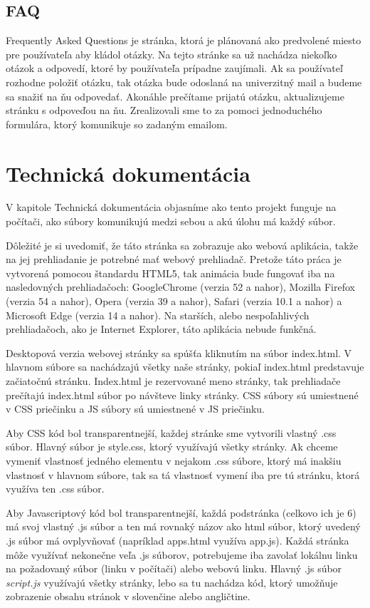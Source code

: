 \subsection{FAQ}
\noindent Frequently Asked Questions je stránka, ktorá je plánovaná ako predvolené miesto pre používateľa aby kládol otázky. Na tejto stránke sa už nachádza niekoľko otázok  a odpovedí, ktoré by používateľa prípadne zaujímali. Ak sa používateľ rozhodne položiť otázku, tak otázka bude odoslaná na univerzitný mail a budeme sa snažiť na ňu odpovedať. Akonáhle prečítame prijatú otázku,  aktualizujeme stránku s odpoveďou na ňu. Zrealizovali sme to za pomoci jednoduchého formulára, ktorý komunikuje so zadaným emailom.

\section{Technická dokumentácia}
\noindent V kapitole Technická dokumentácia objasníme ako tento projekt funguje na počítači, ako súbory komunikujú medzi sebou a akú úlohu má každý súbor. \newline

Dôležité je si uvedomiť, že táto stránka sa zobrazuje ako webová aplikácia, takže na jej prehliadanie je potrebné mať webový prehliadač. Pretože táto práca je vytvorená pomocou štandardu HTML5, tak animácia bude fungovať iba na nasledovných prehliadačoch: GoogleChrome (verzia 52 a nahor), Mozilla Firefox (verzia 54 a nahor), Opera (verzia 39 a nahor), Safari (verzia 10.1 a nahor) a Microsoft Edge (verzia 14 a nahor). Na starších, alebo nespoľahlivých prehliadačoch, ako je Internet Explorer, táto aplikácia nebude funkčná.

Desktopová verzia webovej stránky sa spúšťa kliknutím na súbor index.html. V hlavnom súbore sa nachádzajú všetky naše stránky, pokiaľ index.html predstavuje začiatočnú stránku. Index.html je rezervované meno stránky, tak prehliadače prečítajú index.html súbor po návšteve linky stránky. CSS súbory sú umiestnené v CSS priečinku a JS súbory sú umiestnené v JS priečinku.

Aby CSS kód bol transparentnejší, každej stránke sme vytvorili vlastný .css súbor. Hlavný  súbor je style.css, ktorý využívajú všetky stránky. Ak chceme vymeniť vlastnosť jedného elementu v nejakom .css súbore, ktorý má inakšiu vlastnosť v hlavnom súbore, tak sa tá vlastnosť vymení iba pre tú stránku, ktorá využíva ten .css súbor.

Aby Javascriptový kód bol transparentnejší, každá podstránka (celkovo ich je 6) má svoj vlastný .js súbor a ten má rovnaký názov ako html súbor, ktorý uvedený .js súbor má ovplyvňovať (napríklad apps.html využíva app.js). Každá stránka môže využívať nekonečne veľa .js súborov, potrebujeme iba zavolať lokálnu linku na požadovaný súbor (linku v počítači) alebo webovú linku. Hlavný .js súbor \textit{script.js} využívajú všetky stránky, lebo sa tu nachádza kód, ktorý umožňuje zobrazenie obsahu stránok v slovenčine alebo angličtine. 


